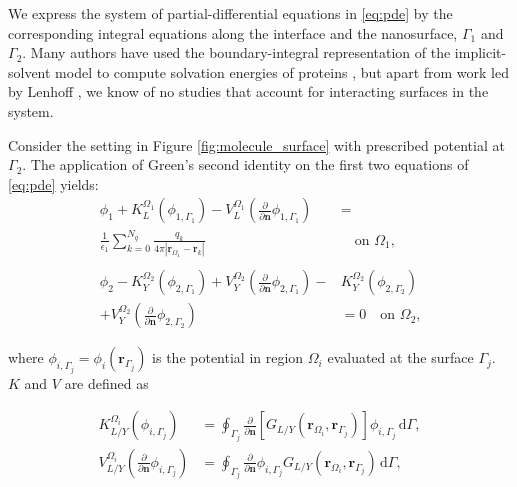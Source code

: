 


We express the system of partial-differential equations in  \eqref{eq:pde} by the corresponding integral equations along the interface and the nanosurface, $\Gamma_1$ and $\Gamma_2$. Many authors have used the boundary-integral representation of the implicit-solvent model to compute solvation energies of proteins \cite{YoonLenhoff1990, Juffer1991a, LuETal2006, BajajETal2011, AltmanBardhanWhiteTidor09, GengKrasny2013, CooperBardhanBarba2013}, but apart from work led by Lenhoff \cite{YoonLenhoff1992}, we know of no studies that account for interacting surfaces in the system. 

Consider the setting in Figure \ref{fig:molecule_surface} with prescribed potential at $\Gamma_2$. The application of Green's second identity on the first two equations of \eqref{eq:pde} yields:
%
\begin{align} \label{eq:green_identity}
\phi_{1}+ K_{L}^{\Omega_1}(\phi_{1,\Gamma_1}) -  V_{L}^{\Omega_1} \left(\frac{\partial}{\partial \mathbf{n}}  \phi_{1,\Gamma_1}  \right) &  = \nonumber\\
 \frac{1}{\epsilon_1} \sum_{k=0}^{N_q}  \frac{q_k}{4\pi|\mathbf{r}_{\Omega_1} - \mathbf{r}_k|} &  \quad \text{on $\Omega_1$,} \nonumber \\ \nonumber \\
\phi_{2} - K_{Y}^{\Omega_2}(\phi_{2,\Gamma_1}) + V_{Y}^{\Omega_2} \left( \frac{\partial}{\partial \mathbf{n}} \phi_{2,\Gamma_1} \right) - & K_{Y}^{\Omega_2}(\phi_{2,\Gamma_2})  \nonumber \\
 + V_{Y}^{\Omega_2}  \left( \frac{\partial}{\partial \mathbf{n}} \phi_{2,\Gamma_2} \right) & = 0 \quad \text{on $\Omega_2$,}
\end{align}

\noindent where $\phi_{i,\Gamma_j} = \phi_i(\mathbf{r}_{\Gamma_j})$ is the potential in region $\Omega_i$ evaluated at the surface $\Gamma_j$. $K$ and $V$ are defined as

%
\begin{align} \label{eq:layers}
K_{L/Y}^{\Omega_i}(\phi_{i,\Gamma_j}) &= \oint_{\Gamma_j} \frac{\partial}{\partial \mathbf{n}} \left[ G_{L/Y}(\mathbf{r}_{\Omega_i},\mathbf{r}_{\Gamma_j}) \right]\phi_{i,\Gamma_j} \, \mathrm{d} \Gamma, \nonumber \\
V_{L/Y}^{\Omega_i} \left( \frac{\partial}{\partial \mathbf{n}} \phi_{i,\Gamma_j} \right) &= \oint_{\Gamma_j} \frac{\partial}{\partial \mathbf{n}} \phi_{i,\Gamma_j} G_{L/Y}(\mathbf{r}_{\Omega_i},\mathbf{r}_{\Gamma_j})  \, \mathrm{d} \Gamma,
\end{align}

